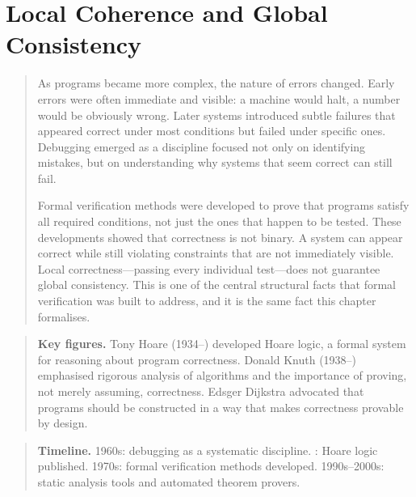 \documentclass[11pt]{book}
\theoremstyle{plain}
\theoremstyle{definition}
\theoremstyle{remark}
\newenvironment{historicalpreamble}
  {\begin{quote}\small}
  {\end{quote}}
\newenvironment{historicalfigures}
  {\begin{quote}\small\textbf{Key figures.}\enspace\ignorespaces}
  {\end{quote}}
\newenvironment{paradigmtimeline}
  {\begin{quote}\small\textbf{Timeline.}\enspace\ignorespaces}
  {\end{quote}}
\begin{document}
\chapter{Local Coherence and Global Consistency}

\begin{historicalpreamble}
As programs became more complex, the nature of errors changed. Early
errors were often immediate and visible: a machine would halt, a number
would be obviously wrong. Later systems introduced subtle failures that
appeared correct under most conditions but failed under specific ones.
Debugging emerged as a discipline focused not only on identifying
mistakes, but on understanding why systems that seem correct can still
fail.

Formal verification methods were developed to prove that programs satisfy
all required conditions, not just the ones that happen to be tested.
These developments showed that correctness is not binary. A system can
appear correct while still violating constraints that are not immediately
visible. Local correctness---passing every individual test---does not
guarantee global consistency. This is one of the central structural facts
that formal verification was built to address, and it is the same fact
this chapter formalises.
\end{historicalpreamble}

\begin{historicalfigures}
Tony Hoare (1934--) developed Hoare logic, a formal system for reasoning
about program correctness. Donald Knuth (1938--) emphasised rigorous
analysis of algorithms and the importance of proving, not merely
assuming, correctness. Edsger Dijkstra advocated that programs should be
constructed in a way that makes correctness provable by design.
\end{historicalfigures}

\begin{paradigmtimeline}
1960s: debugging as a systematic discipline. : Hoare logic published. \quad
1970s: formal verification methods developed. \quad
1990s--2000s: static analysis tools and automated theorem provers.
\end{paradigmtimeline}
\end{document}
